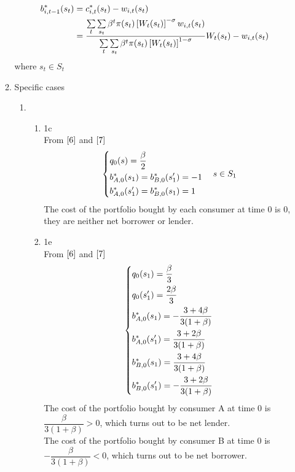 \documentclass{article}
\begin{document}
\begin{enumerate}
\begin{enumerate}
\begin{align}
                b_{i,t-1}^\ast(s_t)&=c_{i,t}^\ast(s_t)-w_{i,t}(s_t)\notag\\
                &=\frac{\sum\limits_{t}\sum\limits_{s_t}\beta^t\pi(s_t)\left[W_t(s_t)\right]^{-\sigma}w_{i,t}(s_t)}{\sum\limits_{t}\sum\limits_{s_t}\beta^t\pi(s_t)\left[W_t(s_t)\right]^{1-\sigma}}W_t(s_t)-w_{i,t}(s_t)\label{7}
            \end{align}
            where \(s_t\in S_t\)
            \item Specific cases
            \begin{enumerate}
                \item 
                \begin{enumerate}
                    \item 1c\\
                    From \(\eqref{6}\) and \(\eqref{7}\)
                    \[\begin{dcases}
                        q_0(s)=\frac{\beta}{2}\\
                        b_{A,0}^\ast(s_1)=b_{B,0}^\ast(s'_1)=-1\\
                        b_{A,0}^\ast(s'_1)=b_{B,0}^\ast(s_1)=1
                    \end{dcases}\quad s\in S_1\]
                    The cost of the portfolio bought by each consumer at time 0 is 0, they are neither net borrower or lender.
                    \item 1e\\
                    From \(\eqref{6}\) and \(\eqref{7}\)
                    \[\begin{dcases}
                        q_0(s_1)=\frac{\beta}{3}\\
                        q_0(s'_1)=\frac{2\beta}{3}\\
                        b_{A,0}^\ast(s_1)=-\frac{3+4\beta}{3(1+\beta)}\\
                        b_{A,0}^\ast(s'_1)=\frac{3+2\beta}{3(1+\beta)}\\
                        b_{B,0}^\ast(s_1)=\frac{3+4\beta}{3(1+\beta)}\\
                        b_{B,0}^\ast(s'_1)=-\frac{3+2\beta}{3(1+\beta)}
                    \end{dcases}\]
                    The cost of the portfolio bought by consumer A at time 0 is \(\dfrac{\beta}{3(1+\beta)}>0\), which turns out to be net lender.\\
                    The cost of the portfolio bought by consumer B at time 0 is \(-\dfrac{\beta}{3(1+\beta)}<0\), which turns out to be net borrower.

\end{enumerate}
\end{enumerate}
\end{enumerate}
\end{enumerate}
\end{document}
